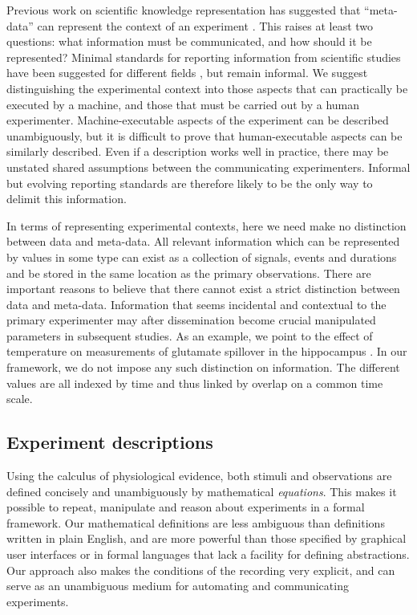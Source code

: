 Previous work on scientific knowledge representation has suggested
that ``meta-data'' can represent the context of an experiment
\citep{Bower2009}. This raises at least two questions: what
information must be communicated, and how should it be represented?
Minimal standards for reporting information from scientific studies
have been suggested for different fields
\citep{Taylor2007,Gibson2008}, but remain informal. We suggest
distinguishing the experimental context into those aspects that can
practically be executed by a machine, and those that must be carried
out by a human experimenter. Machine-executable aspects of the
experiment can be described unambiguously, but it is difficult to prove
that human-executable aspects can be similarly described. Even if a
description works well in practice, there may be unstated shared assumptions
between the communicating experimenters. Informal but evolving reporting
standards are therefore likely to be the only way to delimit this information.

In terms of representing experimental contexts, here we need make no
distinction between data and meta-data. All relevant information which
can be represented by values in some type can exist as a collection of
signals, events and durations and be stored in the same location as
the primary observations. There are important reasons to believe that
there cannot exist a strict distinction between data and
meta-data. Information that seems incidental and contextual to the primary
experimenter may after dissemination become crucial
manipulated parameters in subsequent studies. As an example, we point
to the effect of temperature on measurements of glutamate spillover in
the hippocampus \citep{Kullmann1996, Asztely1997}.  In our framework,
we do not impose any such distinction on information. The different
values are all indexed by time and thus linked by overlap on a common
time scale.

\subsection*{Experiment descriptions}

Using the calculus of physiological evidence, both stimuli and
observations are defined concisely and unambiguously by mathematical
\emph{equations}. This makes it possible to repeat, manipulate and
reason about experiments in a formal framework. Our mathematical
definitions are less ambiguous than definitions written in plain
English, and are more powerful than those specified by graphical user
interfaces or in formal languages that lack a facility for defining
abstractions. Our approach also makes the conditions of the recording
very explicit, and can serve as an unambiguous medium for automating
and communicating experiments. 

